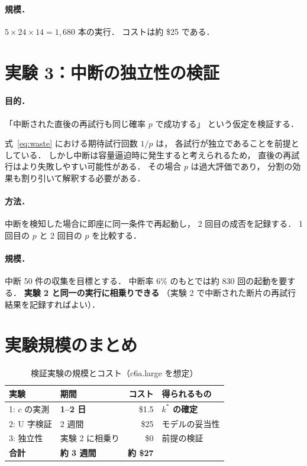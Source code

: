 \documentclass[11pt,a4paper]{ltjsreport}
\begin{document}
\paragraph{規模．}
$5 \times 24 \times 14 = 1{,}680$ 本の実行．
コストは約 \$25 である．

\section{実験 3：中断の独立性の検証}

\paragraph{目的．}
「中断された直後の再試行も同じ確率 $p$ で成功する」
という仮定を検証する．

式~\eqref{eq:waste} における期待試行回数 $1/p$ は，
各試行が独立であることを前提としている．
しかし中断は容量逼迫時に発生すると考えられるため，
直後の再試行はより失敗しやすい可能性がある．
その場合 $p$ は過大評価であり，
分割の効果も割り引いて解釈する必要がある．

\paragraph{方法．}
中断を検知した場合に即座に同一条件で再起動し，
2 回目の成否を記録する．
1 回目の $p$ と 2 回目の $p$ を比較する．

\paragraph{規模．}
中断 50 件の収集を目標とする．
中断率 6\% のもとでは約 830 回の起動を要する．
\textbf{実験 2 と同一の実行に相乗りできる}
（実験 2 で中断された断片の再試行結果を記録すればよい）．

\section{実験規模のまとめ}

\begin{table}[htbp]
\centering
\caption{検証実験の規模とコスト（c6a.large を想定）}
\label{tab:exp_scale}
\small
\begin{tabularx}{\textwidth}{@{}llrX@{}}
\toprule
実験 & 期間 & コスト & 得られるもの \\
\midrule
1: $c$ の実測   & \textbf{1--2 日} & \$1.5 & \textbf{$k^{*}$ の確定} \\
2: U 字検証     & 2 週間 & \$25 & モデルの妥当性 \\
3: 独立性       & 実験 2 に相乗り & \$0 & 前提の検証 \\
\midrule
\textbf{合計}   & \textbf{約 3 週間} & \textbf{約 \$27} & \\
\bottomrule
\end{tabularx}
\end{table}
\end{document}
